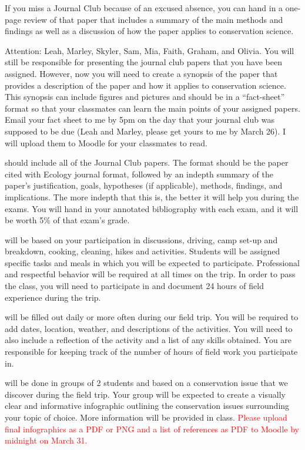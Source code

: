 \documentclass{tufte-handout}
\begin{document}
\begin{fullwidth}
If you miss a Journal Club because of an excused absence, you can hand in a one-page review of that paper that includes a summary of the main methods and findings as well as a discussion of how the paper applies to conservation science. 

\newthought{\textcolor{red}{Journal Club Leaders: Online expectations:}} Attention: Leah, Marley, Skyler, Sam, Mia, Faith, Graham, and Olivia. You will still be responsible for presenting the journal club papers that you have been assigned. However, now you will need to create a synopsis of the paper that provides a description of the paper and how it applies to conservation science. This synopsis can include figures and pictures and should be in a ``fact-sheet'' format so that your classmates can learn the main points of your assigned papers. Email your fact sheet to me by 5pm on the day that your journal club was supposed to be due (Leah and Marley, please get yours to me by March 26). I will upload them to Moodle for your classmates to read.

\newthought{\textcolor{red}{Exam Annotated Bibliography}} should include all of the Journal Club papers. The format should be the paper cited with Ecology journal format, followed by an indepth summary of the paper's justification, goals, hypotheses (if applicable), methods, findings, and implications. The more indepth that this is, the better it will help you during the exams. You will hand in your annotated bibliography with each exam, and it will be worth 5\% of that exam's grade. 


 will be based on your participation in discussions, driving, camp set-up and breakdown, cooking, cleaning, hikes and activities. Students will be assigned specific tasks and meals in which you will be expected to participate. Professional and respectful behavior will be required at all times on the trip. In order to pass the class, you will need to participate in and document 24 hours of field experience during the trip.

 will be filled out daily or more often during our field trip. You will be required to add dates, location, weather, and descriptions of the activities. You will need to also include a reflection of the activity and a list of any skills obtained. You are responsible for keeping track of the number of hours of field work you participate in.

 will be done in groups of 2 students and based on a conservation issue that we discover during the field trip. Your group will be expected to create a visually clear and informative infographic outlining the conservation issues surrounding your topic of choice. More information will be provided in class. \textcolor{red}{Please upload final infographics as a PDF or PNG and a list of references as PDF to Moodle by midnight on March 31.}



\end{fullwidth}
\end{document}
